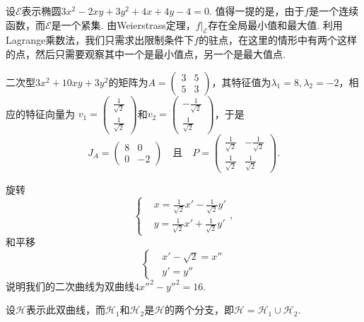 \begin{solution}
\begin{inparaenum}[(a)]
    \begin{nota}
      设$\mathscr E$表示椭圆$3x^2-2xy+3y^2+4x+4y-4=0$. 值得一提的是，由于$f$是一个连续函数，而$\mathscr E$是一个紧集. 由Weierstrass定理，$f|_{\mathscr E}$存在全局最小值和最大值. 利用Lagrange乘数法，我们只需求出限制条件下$f$的驻点，在这里的情形中有两个这样的点，然后只需要观察其中一个是最小值点，另一个是最大值点.
    \end{nota}

    \item 二次型$3x^2+10xy+3y^2$的矩阵为$A=\begin{pmatrix}
          3 & 5 \\
          5 & 3
        \end{pmatrix}$，其特征值为$\lambda_1=8,\lambda_2=-2$，相应的特征向量为
        $ v_1=\begin{pmatrix}
          \frac1{\sqrt2} \\
          \frac1{\sqrt2}
        \end{pmatrix}$和$v_2=\begin{pmatrix}
          -\frac1{\sqrt2} \\
          \frac1{\sqrt2}
        \end{pmatrix}$，于是
        \[
          J_A = \begin{pmatrix}
            8 & 0 \\
            0 & -2
          \end{pmatrix} \quad \text{且} \quad
          P = \begin{pmatrix}
            \frac1{\sqrt2} & - \frac1{\sqrt2} \\
            \frac1{\sqrt2} & \frac1{\sqrt2}
          \end{pmatrix}.
        \]

       旋转
       \[
         \left\{
           \begin{aligned}
             & x = \frac1{\sqrt2}x' - \frac1{\sqrt2}y' \\
             & y = \frac1{\sqrt2}x' + \frac1{\sqrt2}y'
           \end{aligned}
         \right.,
       \]
       和平移
       \[
         \left\{
           \begin{aligned}
             & x' - \sqrt2 = x'' \\
             & y' = y''
           \end{aligned}
         \right.
       \]
       说明我们的二次曲线为双曲线$4x''^2-y''^2=16$.

       设$\mathscr H$表示此双曲线，而$\mathscr H_1$和$\mathscr H_2$是$\mathscr H$的两个分支，即$\mathscr H=\mathscr H_1\cup\mathscr H_2$.


\end{inparaenum}
\end{solution}
